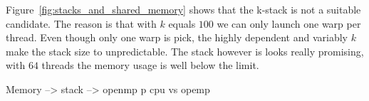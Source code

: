 Figure~\ref{fig:stacks_and_shared_memory} shows that the k-stack is not a suitable candidate. The reason is that with $k$ equals $100$ we can only launch one warp per thread. Even though only one warp is pick, the highly dependent and variably $k$ make the stack size to unpredictable. The stack however is looks really promising, with $64$ threads the memory usage is well below the limit.







Memory --> stack  --> openmp
p
cpu vs opemp



















